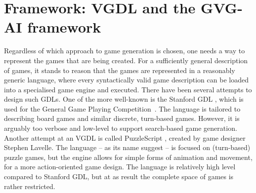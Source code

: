 \documentclass[a4paper,titlepage,final]{report}
\begin{document}





\section{Framework: VGDL and the GVG-AI framework}
\label{sec_gvgaiframework}
Regardless of which approach to game generation is chosen, one needs a way to represent the games that are being created. %
For a sufficiently general description of games, it stands to reason that the games are represented in a reasonably generic language, where every syntactically valid game description can be loaded into a specialised game engine and executed. 
There have been several attempts to design such GDLs. One of the more well-known is the Stanford GDL \citep{love2008general}, which is used for the General Game Playing Competition~\citep{genesereth2005general}. The language is tailored to describing board games and similar discrete, turn-based games. 
However, it is arguably too verbose and low-level to support search-based game generation. 
Another attempt at an VGDL is called PuzzleScript \citep{puzzlescript}, created by game designer Stephen Lavelle. 
The language -- as its name suggest -- is focused on (turn-based) puzzle games, but the engine allows for simple forms of animation and movement, for a more action-oriented game design. 
The language is relatively high level compared to Stanford GDL, but at as result the complete space of  games is rather restricted.
\end{document}
